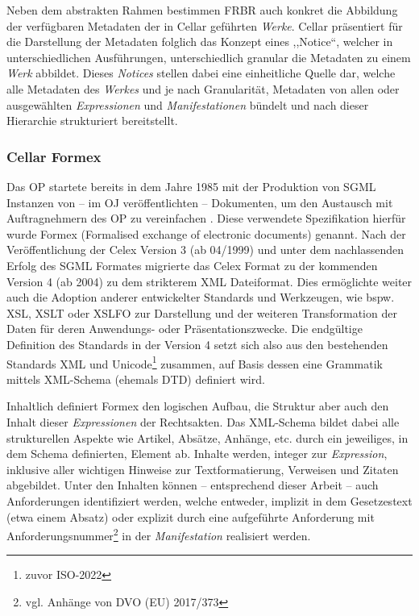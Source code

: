     \noindent
    Neben dem abstrakten Rahmen bestimmen \acs{FRBR} auch konkret die Abbildung der verfügbaren Metadaten der in Cellar geführten \textit{Werke}.
    Cellar präsentiert für die Darstellung der Metadaten folglich das Konzept eines ,,Notice``, welcher in unterschiedlichen Ausführungen, unterschiedlich granular die Metadaten zu einem \textit{Werk} abbildet.
    Dieses \textit{Notices} stellen dabei eine einheitliche Quelle dar, welche alle Metadaten des \textit{Werkes} und je nach Granularität, Metadaten von allen oder ausgewählten \textit{Expressionen} und \textit{Manifestationen} bündelt und nach dieser Hierarchie strukturiert bereitstellt.
    \cite[S. 31f]{eu_cellar}

\subsubsection{Cellar Formex}

    Das \acf{OP} startete bereits in dem Jahre 1985 mit der Produktion von \ac{SGML} Instanzen von -- im \ac{OJ} veröffentlichten -- Dokumenten, um den Austausch mit Auftragnehmern des \ac{OP} zu vereinfachen \cite[75]{eu_cellar, eu_fmx4_intro}.
    Diese verwendete Spezifikation hierfür wurde Formex (Formalised exchange of electronic documents) genannt.
    Nach der Veröffentlichung der Celex Version 3 (ab 04/1999) und unter dem nachlassenden Erfolg des \ac{SGML} Formates migrierte das Celex Format zu der kommenden Version 4 (ab 2004) zu dem strikterem \ac{XML} Dateiformat.
    Dies ermöglichte weiter auch die Adoption anderer entwickelter Standards und Werkzeugen, wie bspw. \ac{XSL}, \ac{XSLT} oder \ac{XSLFO} zur Darstellung und der weiteren Transformation der Daten für deren Anwendungs- oder Präsentationszwecke.
    Die endgültige Definition des Standards in der Version 4 setzt sich also aus den bestehenden Standards \ac{XML} und Unicode\footnote{zuvor ISO-2022} zusammen, auf Basis dessen eine Grammatik mittels \ac{XML}-Schema (ehemals \ac{DTD}) definiert wird. \cite{eu_fmx4_intro}
    
    \medskip
    Inhaltlich definiert Formex den logischen Aufbau, die Struktur aber auch den Inhalt  dieser \textit{Expressionen} der Rechtsakten.
    Das \ac{XML}-Schema bildet dabei alle strukturellen Aspekte wie Artikel, Absätze, Anhänge, etc. durch ein jeweiliges, in dem Schema definierten, Element ab. 
    Inhalte werden, integer zur \textit{Expression}, inklusive aller wichtigen Hinweise zur Textformatierung, Verweisen und Zitaten abgebildet. 
    Unter den Inhalten können -- entsprechend dieser Arbeit -- auch Anforderungen identifiziert werden, welche entweder, implizit in dem Gesetzestext (etwa einem Absatz) oder explizit durch eine aufgeführte Anforderung mit Anforderungsnummer\footnote{vgl. Anhänge von \acs{DVO} (\acs{EU})  2017/373} in der \textit{Manifestation} realisiert werden.

